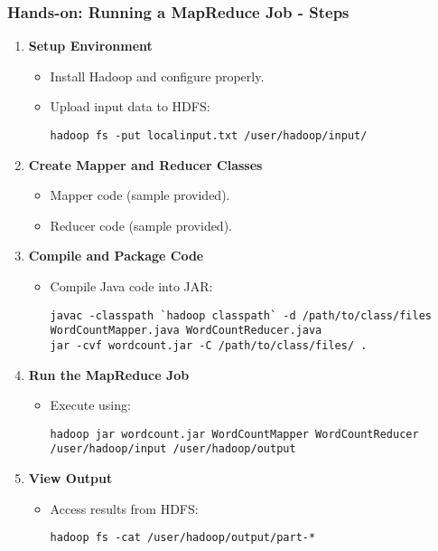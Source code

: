 \documentclass[aspectratio=169]{beamer}
\begin{document}
\begin{frame}[fragile]
    \frametitle{Hands-on: Running a MapReduce Job - Steps}
    \begin{enumerate}
        \item \textbf{Setup Environment}
            \begin{itemize}
                \item Install Hadoop and configure properly.
                \item Upload input data to HDFS:
                \begin{lstlisting}
hadoop fs -put localinput.txt /user/hadoop/input/
                \end{lstlisting}
            \end{itemize}
        \item \textbf{Create Mapper and Reducer Classes}
            \begin{itemize}
                \item Mapper code (sample provided).
                \item Reducer code (sample provided).
            \end{itemize}
        \item \textbf{Compile and Package Code}
            \begin{itemize}
                \item Compile Java code into JAR:
                \begin{lstlisting}
javac -classpath `hadoop classpath` -d /path/to/class/files WordCountMapper.java WordCountReducer.java
jar -cvf wordcount.jar -C /path/to/class/files/ .
                \end{lstlisting}
            \end{itemize}
        \item \textbf{Run the MapReduce Job}
            \begin{itemize}
                \item Execute using:
                \begin{lstlisting}
hadoop jar wordcount.jar WordCountMapper WordCountReducer /user/hadoop/input /user/hadoop/output
                \end{lstlisting}
            \end{itemize}
        \item \textbf{View Output}
            \begin{itemize}
                \item Access results from HDFS:
                \begin{lstlisting}
hadoop fs -cat /user/hadoop/output/part-*
                \end{lstlisting}
            \end{itemize}
    \end{enumerate}
\end{frame}
\end{document}

